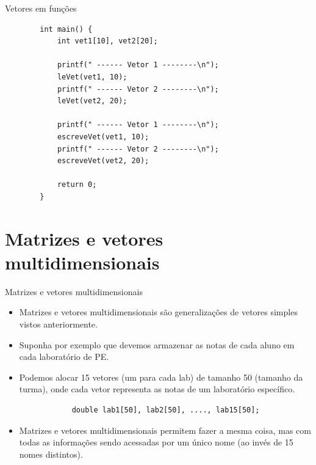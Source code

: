 \documentclass[handout]{beamer}
\begin{document}
\begin{frame}[fragile]{Vetores em funções}

    \begin{verbatim}
        int main() {
            int vet1[10], vet2[20];

            printf(" ------ Vetor 1 --------\n");
            leVet(vet1, 10);
            printf(" ------ Vetor 2 --------\n");
            leVet(vet2, 20);

            printf(" ------ Vetor 1 --------\n");
            escreveVet(vet1, 10);
            printf(" ------ Vetor 2 --------\n");
            escreveVet(vet2, 20);

            return 0;
        }
    \end{verbatim}

\end{frame}



\section{Matrizes e vetores multidimensionais}

\begin{frame}[fragile]{Matrizes e vetores multidimensionais}

    \begin{itemize}
        \item Matrizes e vetores multidimensionais são generalizações de vetores simples vistos anteriormente.
        \item Suponha por exemplo que devemos armazenar as notas de cada aluno em cada laboratório de PE.
        \item Podemos alocar 15 vetores (um para cada lab) de tamanho 50 (tamanho da turma), onde cada vetor representa as notas de um laboratório específico.

        \begin{verbatim}
            double lab1[50], lab2[50], ...., lab15[50];
        \end{verbatim}

        \item Matrizes e vetores multidimensionais permitem fazer a mesma coisa, mas com todas as informações sendo acessadas por um único nome (ao invés de 15 nomes distintos).
    \end{itemize}

\end{frame}
\end{document}
